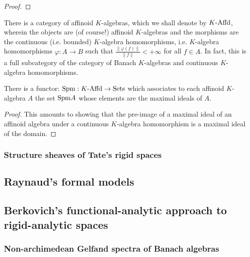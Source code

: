                 \begin{proof}
                    
                \end{proof}
            \begin{corollary}
                There is a category of affinoid $K$-algebras, which we shall denote by $K\text{-}\mathrm{Affd}$, wherein the objects are (of course!) affinoid $K$-algebras and the morphisms are the continuous (i.e. bounded) $K$-algebra homomorphisms, i.e. $K$-algebra homomorphisms $\varphi: A \to B$ such that $\frac{\|\varphi(f)\|}{\|f\|} < +\infty$ for all $f \in A$. In fact, this is a full subcategory of the category of Banach $K$-algebras and continuous $K$-algebra homomorphisms.
            \end{corollary}
            \begin{proposition} \label{prop: maximal_spectra_of_affinoid_algebras}
                There is a functor: $\mathrm{Spm}: K\text{-}\mathrm{Affd} \to \mathrm{Sets}$ which associates to each affinoid $K$-algebra $A$ the set $\mathrm{Spm} A$ whose elements are the maximal ideals of $A$. 
            \end{proposition}
                \begin{proof}
                    This amounts to showing that the pre-image of a maximal ideal of an affinoid algebra under a continuous $K$-algebra homomorphism is a maximal ideal of the domain. 
                \end{proof}
        
        \subsubsection{Structure sheaves of Tate's rigid spaces}
    
    \subsection{Raynaud's formal models}
    
    \subsection{Berkovich's functional-analytic approach to rigid-analytic spaces}
        \subsubsection{Non-archimedean Gelfand spectra of Banach algebras}